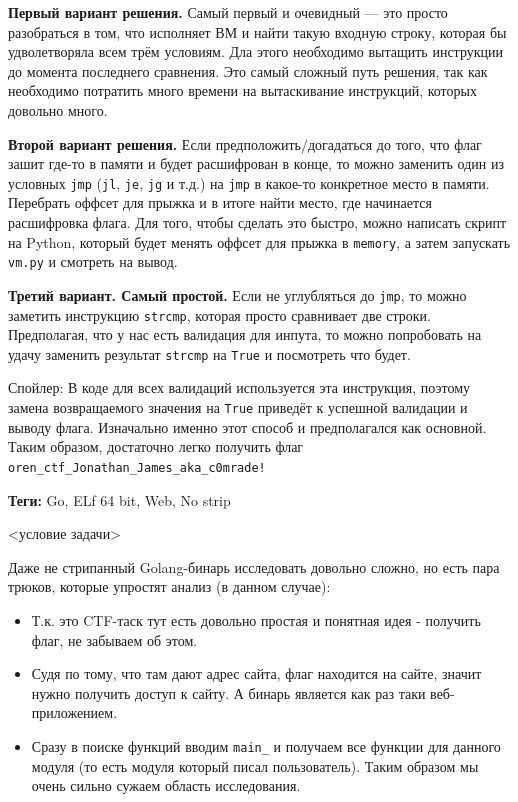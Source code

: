 \documentclass[idxtotoc,hyperref,openany,oneside]{files/reverse} %
\begin{document}
\textbf{Первый вариант решения.}
Самый первый и очевидный — это просто разобраться в том, что исполняет ВМ и найти такую входную строку, которая бы удволетворяла всем трём условиям. Дла этого необходимо вытащить инструкции до момента последнего сравнения. Это самый сложный путь решения, так как необходимо потратить много времени на вытаскивание инструкций, которых довольно много.

\textbf{Второй вариант решения.}
Если предположить/догадаться до того, что флаг зашит где-то в памяти и будет расшифрован в конце, то можно заменить один из условных \verb|jmp| (\verb|jl|, \verb|je|, \verb|jg| и т.д.) на \verb|jmp| в какое-то конкретное место в памяти. Перебрать оффсет для прыжка и в итоге найти место, где начинается расшифровка флага. Для того, чтобы сделать это быстро, можно написать скрипт на Python, который будет менять оффсет для прыжка в \verb|memory|, а затем запускать \verb|vm.py| и смотреть на вывод.

\textbf{Третий вариант. Самый простой.}
Если не углубляться до \verb|jmp|, то можно заметить инструкцию \verb|strcmp|, которая просто сравнивает две строки. Предполагая, что у нас есть валидация для инпута, то можно попробовать на удачу заменить результат \verb|strcmp| на \verb|True| и посмотреть что будет.

Спойлер: В коде для всех валидаций используется эта инструкция, поэтому замена возвращаемого значения на \verb|True| приведёт к успешной валидации и выводу флага. Изначально именно этот способ и предполагался как основной. Таким образом, достаточно легко получить флаг \verb|oren_ctf_Jonathan_James_aka_c0mrade!|




\textbf{Теги:} Go, ELf 64 bit, Web, No strip\vspace{\baselineskip}

\begin{tcolorbox}
<условие задачи>
\end{tcolorbox}

Даже не стрипанный Golang-бинарь исследовать довольно сложно, но есть пара трюков, которые упростят анализ (в данном случае):
\begin{itemize}
\item Т.к. это CTF-таск тут есть довольно простая и понятная идея - получить флаг, не забываем об этом.
\item Судя по тому, что там дают адрес сайта, флаг находится на сайте, значит нужно получить доступ к сайту. А бинарь является как раз таки веб-приложением.
\item Сразу в поиске функций вводим \verb|main_| и получаем все функции для данного модуля (то есть модуля который писал пользователь). Таким образом мы очень сильно сужаем область исследования.
\end{itemize}
\end{document}
